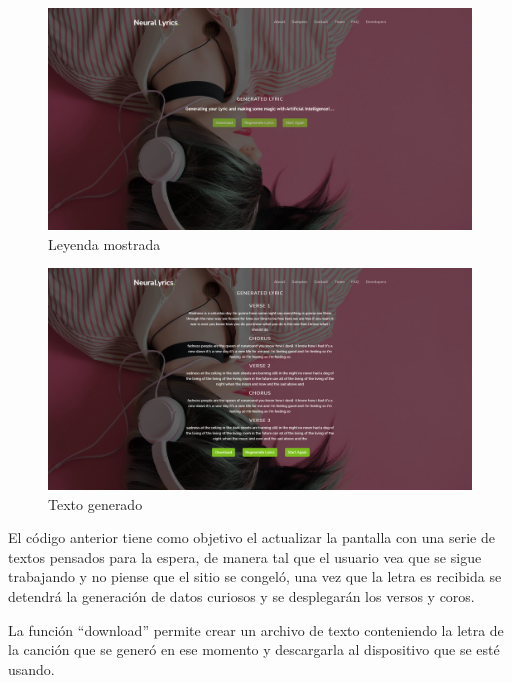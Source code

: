 \documentclass[12pt, a4paper, titlepage]{article}
\begin{document}
	\begin{figure}[H]
		\includegraphics[width=13.5cm]{./Imagenes/AplicacionWeb/pgenerating.png}
		\centering 
		\caption{Leyenda mostrada}
	\end{figure}
	\begin{figure}[H]
		\includegraphics[width=13.5cm]{./Imagenes/AplicacionWeb/Generated.png}
		\centering 
		\caption{Texto generado}
	\end{figure}
	\newpage
	\begin{center}
		
	\end{center}
	El código anterior tiene como objetivo el actualizar la pantalla con una serie de textos pensados para la espera, de manera tal que el usuario vea que se sigue trabajando y no piense que el sitio se congeló, una vez que la letra es recibida se detendrá la generación de datos curiosos y se desplegarán los versos y coros.
	\begin{center}
		
	\end{center}
	La función “download” permite crear un archivo de texto conteniendo la letra de la canción que se generó en ese momento y descargarla al dispositivo que se esté usando.
\end{document}
